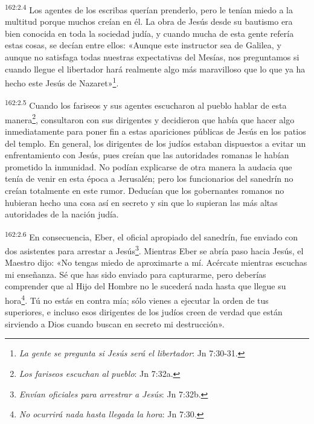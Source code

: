\par
\textsuperscript{162:2.4} Los agentes de los escribas querían prenderlo, pero le tenían miedo a la multitud porque muchos creían en él. La obra de Jesús desde su bautismo era bien conocida en toda la sociedad judía, y cuando mucha de esta gente refería estas cosas, se decían entre ellos: «Aunque este instructor sea de Galilea, y aunque no satisfaga todas nuestras expectativas del Mesías, nos preguntamos si cuando llegue el libertador hará realmente algo más maravilloso que lo que ya ha hecho este Jesús de Nazaret»\footnote{\textit{La gente se pregunta si Jesús será el libertador}: Jn 7:30-31.}.

\par
\textsuperscript{162:2.5} Cuando los fariseos y sus agentes escucharon al pueblo hablar de esta manera\footnote{\textit{Los fariseos escuchan al pueblo}: Jn 7:32a.}, consultaron con sus dirigentes y decidieron que había que hacer algo inmediatamente para poner fin a estas apariciones públicas de Jesús en los patios del templo. En general, los dirigentes de los judíos estaban dispuestos a evitar un enfrentamiento con Jesús, pues creían que las autoridades romanas le habían prometido la inmunidad. No podían explicarse de otra manera la audacia que tenía de venir en esta época a Jerusalén; pero los funcionarios del sanedrín no creían totalmente en este rumor. Deducían que los gobernantes romanos no hubieran hecho una cosa así en secreto y sin que lo supieran las más altas autoridades de la nación judía.

\par
\textsuperscript{162:2.6} En consecuencia, Eber, el oficial apropiado del sanedrín, fue enviado con dos asistentes para arrestar a Jesús\footnote{\textit{Envían oficiales para arrestrar a Jesús}: Jn 7:32b.}. Mientras Eber se abría paso hacia Jesús, el Maestro dijo: «No tengas miedo de aproximarte a mí. Acércate mientras escuchas mi enseñanza. Sé que has sido enviado para capturarme, pero deberías comprender que al Hijo del Hombre no le sucederá nada hasta que llegue su hora\footnote{\textit{No ocurrirá nada hasta llegada la hora}: Jn 7:30.}. Tú no estás en contra mía; sólo vienes a ejecutar la orden de tus superiores, e incluso esos dirigentes de los judíos creen de verdad que están sirviendo a Dios cuando buscan en secreto mi destrucción».

